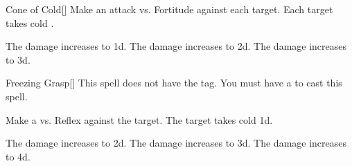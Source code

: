 \lowercase{\hypertarget{spell:Cone of Cold}{}}\label{spell:Cone of Cold}
\begin{freeability}[Rank 1]{\hypertarget{spell:Cone of Cold}{Cone of Cold}}[]
Make an attack vs. Fortitude against each target.
\hit Each target takes cold .

\rankline
{} The damage increases to  \plus1d.
 The damage increases to  \plus2d.
 The damage increases to  \plus3d.
\end{freeability}
\vspace{0.25em}



\lowercase{\hypertarget{spell:Freezing Grasp}{}}\label{spell:Freezing Grasp}
\begin{freeability}[Rank 1]{\hypertarget{spell:Freezing Grasp}{Freezing Grasp}}[]
This spell does not have the  tag.
You must have a  to cast this spell.

Make a  vs. Reflex against the target.
\hit The target takes cold  \plus1d.

\rankline
{} The damage increases to  \plus2d.
 The damage increases to  \plus3d.
 The damage increases to  \plus4d.
\end{freeability}
\vspace{0.25em}



